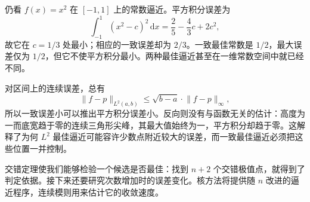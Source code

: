 \ProseParagraphBreak
仍看 \(f(x)=x^2\) 在 \([-1,1]\) 上的常数逼近。平方积分误差为
\[
 \int_{-1}^1(x^2-c)^2\,\mathrm{d}x
 =\frac25-\frac43c+2c^2,
\]
故它在 \(c=1/3\) 处最小；相应的一致误差却为 \(2/3\)。一致最佳常数是 \(1/2\)，最大误差仅为 \(1/2\)，但它不使平方积分最小。两种最佳逼近甚至在一维常数空间中就已经不同。

\ProseParagraphBreak
对区间上的连续误差，总有
\[
 \lVert f-p\rVert_{L^2(a,b)}
 \leq\sqrt{b-a}\cdot\lVert f-p\rVert_\infty,
\]
所以一致误差小可以推出平方积分误差小。反向则没有与函数无关的估计：高度为一而底宽趋于零的连续三角形尖峰，其最大值始终为一，平方积分却趋于零。这解释了为何 \(L^2\) 最佳逼近可能容许少数点附近较大的误差，而一致最佳逼近必须把这些位置一并控制。

\ProseParagraphBreak
交错定理使我们能够检验一个候选是否最佳：找到 \(n+2\) 个交错极值点，就得到了判定依据。接下来还要研究次数增加时的误差变化。核方法将提供随 \(n\) 改进的逼近程序，连续模则用来估计它的收敛速度。
